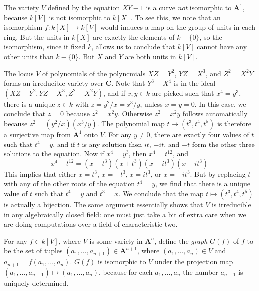 \begin{example}
    The variety $V$ defined by the equation $XY - 1$ is a curve {\it not} isomorphic to $\mathbf{A}^1$, because $k[V]$ is not isomorphic to $k[X]$. To see this, we note that an isomorphism $f: k[X] \to k[V]$ would induces a map on the group of units in each ring. But the units in $k[X]$ are exactly the elements of $k - \{ 0 \}$, so the isomorphism, since it fixed $k$, allows us to conclude that $k[V]$ cannot have any other units than $k - \{ 0 \}$. But $X$ and $Y$ are both units in $k[V]$.
\end{example}

\begin{example}
    The locus $V$ of polynomials of the polynomials $XZ = Y^2$, $YZ = X^3$, and $Z^2 = X^2Y$ forms an irreducible variety over $\mathbf{C}$. Note that $Y^3 - X^4$ is in the ideal $(XZ - Y^2, YZ - X^3, Z^2 - X^2Y)$, and if $x,y \in k$ are picked such that $x^4 = y^3$, there is a unique $z \in k$ with $z = y^2/x = x^3/y$, unless $x = y = 0$. In this case, we conclude that $z = 0$ because $z^2 = x^2y$. Otherwise $z^2 = x^2y$ follows automatically because $z^2 = (y^2/x)(x^3/y)$. The polynomial map $t \mapsto (t^3,t^4,t^5)$ is therefore a surjective map from $\mathbf{A}^1$ onto $V$. For any $y \neq 0$, there are exactly four values of $t$ such that $t^4 = y$, and if $t$ is any solution then $it$, $-it$, and $-t$ form the other three solutions to the equation. Now if $x^4 = y^3$, then $x^4 = t^{12}$, and
    \[ x^4 - t^{12} = (x - t^3)(x + t^3)(x - it^3)(x + it^3) \]
    This implies that either $x = t^3$, $x = -t^3$, $x = it^3$, or $x = -it^3$. But by replacing $t$ with any of the other roots of the equation $t^4 = y$, we find that there is a unique value of $t$ such that $t^4 = y$ and $t^3 = x$. We conclude that the map $t \mapsto (t^3,t^4,t^5)$ is actually a bijection. The same argument essentially shows that $V$ is irreducible in any algebraically closed field: one must just take a bit of extra care when we are doing computations over a field of characteristic two.
\end{example}

\begin{example}
    For any $f \in k[V]$, where $V$ is some variety in $\mathbf{A}^n$, define the \emph{graph} $G(f)$ of $f$ to be the set of tuples $(a_1, \dots, a_{n+1}) \in \mathbf{A}^{n+1}$, where $(a_1, \dots, a_n) \in V$ and $a_{n+1} = f(a_1, \dots, a_n)$. $G(f)$ is isomorphic to $V$ under the projection map $(a_1, \dots, a_{n+1}) \mapsto (a_1, \dots, a_n)$, because for each $a_1, \dots, a_n$ the number $a_{n+1}$ is uniquely determined.
\end{example}

